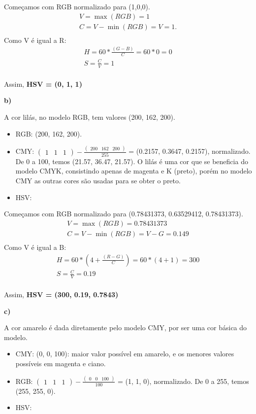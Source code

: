 \documentclass[12pt]{article}
\begin{document}
Começamos com RGB normalizado para (1,0,0).
\begin{gather*}
V = \max(RGB) = 1 \\
C = V-\min(RGB) = V = 1.\\
\end{gather*}
Como V é igual a R:
\begin{gather*}
H = 60*\frac{(G-B)}{C} = 60*0 = 0\\
S = \frac{C}{V} = 1\\
\end{gather*}

Assim, \textbf{HSV = (0, 1, 1)}

\bigskip
\textbf{b)}

A cor lilás, no modelo RGB, tem valores (200, 162, 200).

\bigskip
\begin{itemize}
    \item RGB: (200, 162, 200).
    \item CMY: $\begin{pmatrix}1 & 1 & 1\end{pmatrix} - \frac{\begin{pmatrix}200 & 162 & 200\end{pmatrix}}{255}$ = (0.2157, 0.3647, 0.2157), normalizado. De 0 a 100, temos (21.57, 36.47, 21.57). O lilás é uma cor que se beneficia do modelo CMYK, consistindo apenas de magenta e K (preto), porém no modelo CMY as outras cores são usadas para se obter o preto.
    \item HSV:
\end{itemize}{}

Começamos com RGB normalizado para (0.78431373, 0.63529412, 0.78431373).
\begin{gather*}
V = \max(RGB) = 0.78431373 \\
C = V-\min(RGB) = V-G = 0.149\\
\end{gather*}
Como V é igual a B:
\begin{gather*}
H = 60*(4+\frac{(R-G)}{C}) = 60*(4+1) = 300\\
S = \frac{C}{V} = 0.19\\
\end{gather*}

Assim, \textbf{HSV = (300, 0.19, 0.7843)}

\bigskip
\textbf{c)}

A cor amarelo é dada diretamente pelo modelo CMY, por ser uma cor básica do modelo.

\bigskip
\begin{itemize}
    \item CMY: (0, 0, 100): maior valor possível em amarelo, e os menores valores possíveis em magenta e ciano.
    \item RGB: $\begin{pmatrix}1 & 1 & 1\end{pmatrix} - \frac{\begin{pmatrix}0 & 0 & 100\end{pmatrix}}{100}$ = (1, 1, 0), normalizado. De 0 a 255, temos (255, 255, 0). 
    \item HSV:
\end{itemize}{}
\end{document}
